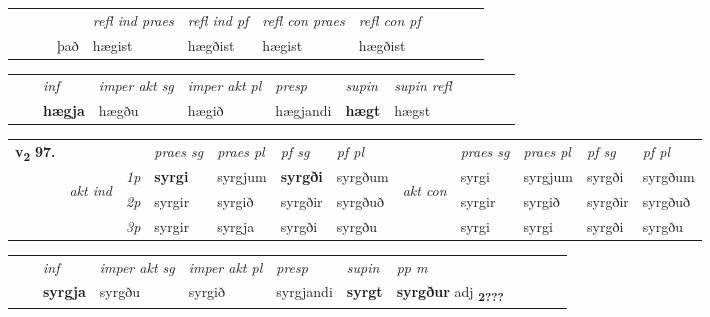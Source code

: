 \begin{tabular}{llllllllllll}
 & &  & &  \textit{refl ind praes} & \textit{refl ind pf} & \textit{refl con praes} & \textit{refl con pf} \\*
 & &  & það & hægist & hægðist & hægist & hægðist \\*
\cmidrule{5-9}
\end{tabular}


\begin{tabular}{llllllllllll}
 & & \textit{inf} & \textit{imper akt sg} & \textit{imper akt pl}   & \textit{presp} & \textit{supin} & \textit{supin refl}      \\*
  & & \textbf{hægja} & hægðu  & hægið   & hægjandi &  \textbf{hægt} & hægst  \\*
\cmidrule{1-12}
\end{tabular}



\begin{tabular}{llllllllllll} \toprule
\multirow{4}{*}{{{\textbf{v{\textsubscript{2}}} \Large{\textbf{97.}}}}}  & &   &  \textit{praes sg}  & \textit{praes pl}  &\textit{ pf sg} & \textit{pf pl} &  &  \textit{praes sg}  & \textit{praes pl}  & \textit{pf sg} & \textit{pf pl } \\*
	\cmidrule{4-7} \cmidrule{9-12}
 & \multirow{3}{*}{\begin{turn}{90}\textit{akt ind}\end{turn}} & {\textit{1p}} & \textbf{syrgi} & syrgjum    & \textbf{syrgði} & syrgðum & \multirow{3}{*}{\begin{turn}{90}\textit{akt con}\end{turn}} &syrgi & syrgjum & syrgði & syrgðum\\*
& &  {\textit{2p}} &  syrgir  & syrgið   & syrgðir & syrgðuð & & syrgir & syrgið & syrgðir & syrgðuð \\*
& &  {\textit{3p}} & syrgir & syrgja   & syrgði & syrgðu & & syrgi & syrgi& syrgði & syrgðu  \\*
\cmidrule{4-7} \cmidrule{9-12}
\end{tabular}


\begin{tabular}{llllllllllll}
 & & \textit{inf} & \textit{imper akt sg} & \textit{imper akt pl}   & \textit{presp} & \textit{supin}  & \textit{pp m}     \\*
  & & \textbf{syrgja} & syrgðu  & syrgið   & syrgjandi &  \textbf{syrgt}  & \textbf{syrgður} adj \textbf{\textsubscript{2???}} \\*
\cmidrule{1-12}
\end{tabular}



